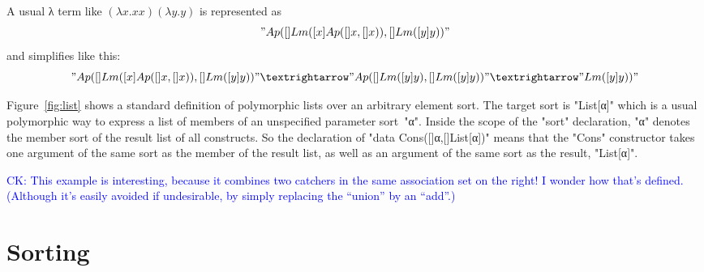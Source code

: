 \documentclass[letterpaper,11pt]{article}
\newcommand{\CK}[1]{\textcolor{blue}{CK: #1}}
\begin{document}
\begin{example}
\begin{itemize}
  \end{itemize}
  A usual λ term like $(λx.x x)(λy.y)$ is represented as
  \begin{displaymath}
    "Ap([]Lm([x]Ap([]x, []x)), []Lm([y]y))"    
  \end{displaymath}
  and simplifies like this:
  \begin{displaymath}
    "Ap([]Lm([x]Ap([]x, []x)), []Lm([y]y))" →
    "Ap([]Lm([y]y), []Lm([y]y))" →
    "Lm([y]y))"
  \end{displaymath}
\end{example}

\begin{example}[lists]\label{ex:list}
  Figure~\ref{fig:list} shows a standard definition of polymorphic lists over an arbitrary element
  sort.  The target sort is "List[α]" which is a usual polymorphic way to express a list of members
  of an unspecified parameter sort~"α".  Inside the scope of the "sort" declaration, "α" denotes the
  member sort of the result list of all constructs. So the declaration of "data Cons([]α,[]List[α])"
  means that the "Cons" constructor takes one argument of the same sort as the member of the result
  list, as well as an argument of the same sort as the result, "List[α]".

\end{example}



\begin{example}[maps]
\CK{This example is interesting, because it combines two catchers in
the same association set on the right! I wonder how that's defined.
(Although it's easily avoided if undesirable, by simply replacing the
``union'' by an ``add''.)}
\end{example}



\section{Sorting}
\label{sec:sorting}
\end{document}
